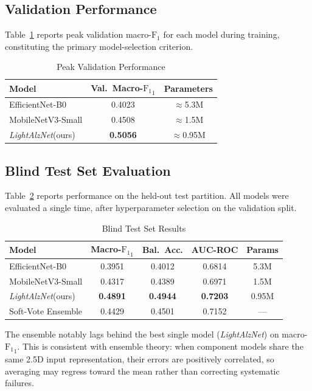 \documentclass[conference]{IEEEtran}
\newcommand{\modelname}{\textit{LightAlzNet}\xspace}
\newcommand{\F}{\mathrm{F_1}}
\begin{document}
\subsection{Validation Performance}
Table~\ref{tab:val} reports peak validation macro-$\F$ for each
model during training, constituting the primary model-selection
criterion.

\begin{table}[htbp]
\caption{Peak Validation Performance}
\label{tab:val}
\centering
\begin{tabular}{lcc}
\toprule
\textbf{Model} & \textbf{Val.\ Macro-$\F_1$} & \textbf{Parameters} \\
\midrule
EfficientNet-B0   & 0.4023 & $\approx$5.3M \\
MobileNetV3-Small & 0.4508 & $\approx$1.5M \\
\modelname (ours) & \textbf{0.5056} & $\approx$0.95M \\
\bottomrule
\end{tabular}
\end{table}

\subsection{Blind Test Set Evaluation}
Table~\ref{tab:test} reports performance on the held-out test
partition. All models were evaluated a single time, after
hyperparameter selection on the validation split.

\begin{table}[htbp]
\caption{Blind Test Set Results}
\label{tab:test}
\centering
\renewcommand{\arraystretch}{1.1}
\begin{tabular}{lcccc}
\toprule
\textbf{Model} & \textbf{Macro-$\F_1$} &
\textbf{Bal.\ Acc.} & \textbf{AUC-ROC} & \textbf{Params} \\
\midrule
EfficientNet-B0    & 0.3951 & 0.4012 & 0.6814 & 5.3M \\
MobileNetV3-Small  & 0.4317 & 0.4389 & 0.6971 & 1.5M \\
\modelname (ours) & \textbf{0.4891} & \textbf{0.4944}
                   & \textbf{0.7203} & 0.95M \\
Soft-Vote Ensemble & 0.4429 & 0.4501 & 0.7152 & --- \\
\bottomrule
\end{tabular}
\end{table}

\noindent The ensemble notably lags behind the best single
model (\modelname) on macro-$\F_1$. This is consistent with
ensemble theory: when component models share the same 2.5D
input representation, their errors are positively correlated,
so averaging may regress toward the mean rather than correcting
systematic failures.
\end{document}

